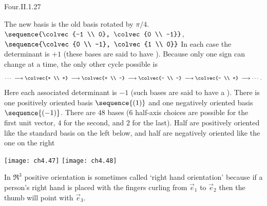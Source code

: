\begin{ans}{Four.II.1.27}
      \begin{exparts}
        \partsitem The new basis is the old basis rotated by \( \pi/4 \).
        \partsitem
          $
             \sequence{\colvec{-1 \\ 0},
                       \colvec{0 \\ -1}}
          $, $
             \sequence{\colvec{0 \\ -1},
                       \colvec{1 \\ 0}}
          $
        \partsitem In each case the determinant is \( +1 \)
          (these bases are said to
          have ).
        \partsitem Because only one sign can change at a time, the only other
          cycle possible is
          \begin{equation*}
             \cdots
             \;\longrightarrow\colvec{+ \\ +}
             \;\longrightarrow\colvec{+ \\ -}
             \;\longrightarrow\colvec{- \\ -}
             \;\longrightarrow\colvec{- \\ +}
             \;\longrightarrow\cdots\,.
          \end{equation*}
          Here each associated determinant is \( -1 \)
          (such bases are said to have a ).
        \partsitem There is one positively oriented basis \( \sequence{(1)} \)
          and one negatively oriented basis \( \sequence{(-1)} \).
        \partsitem There are \( 48 \) bases (\( 6 \) half-axis choices are
          possible for the first unit vector, \( 4 \) for the second, and
          \( 2 \) for the last).
          Half are positively oriented like the standard basis on the left
          below,
          and half are negatively oriented like the one on the right
         \begin{center}
           \texttt{[image: ch4.47]}
           \hspace*{4em}
           \texttt{[image: ch4.48]}
          \end{center}
          In \( \Re^3 \) positive orientation is sometimes called
          `right hand orientation' because if a person's right hand is placed
          with the fingers curling
          from \( \vec{e}_1 \) to \( \vec{e}_2 \) then the
          thumb will point with \( \vec{e}_3 \).
      \end{exparts}
    
\end{ans}
